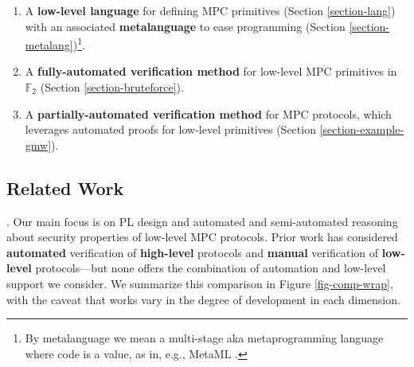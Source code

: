 \begin{enumerate}
\item A \textbf{low-level language} for defining MPC primitives
  (Section \ref{section-lang}) with an associated \textbf{metalanguage}
  to ease programming (Section \ref{section-metalang})\footnote{By metalanguage
  we mean a multi-stage aka metaprogramming language where code is a value, as
  in, e.g., MetaML \cite{TAHA2000211}.}. 
\item A \textbf{fully-automated verification method} for low-level MPC
  primitives in $\mathbb{F}_2$ (Section \ref{section-bruteforce}).
\item A \textbf{partially-automated verification method} for
  MPC protocols, which leverages automated proofs for
  low-level primitives (Section \ref{section-example-gmw}).
\end{enumerate}

\subsection{Related Work}
\label{section-related-work}

.
Our main focus is on PL design and automated and semi-automated
reasoning about security properties of low-level MPC protocols. Prior
work has considered \textbf{automated} verification of
\textbf{high-level} protocols and \textbf{manual} verification of
\textbf{low-level} protocols---but none offers the combination of
automation and low-level support we consider.
%
We summarize this comparison in Figure
\ref{fig-comp-wrap}, with the caveat that works vary in the degree of
development in each dimension.


\compwrapfig

